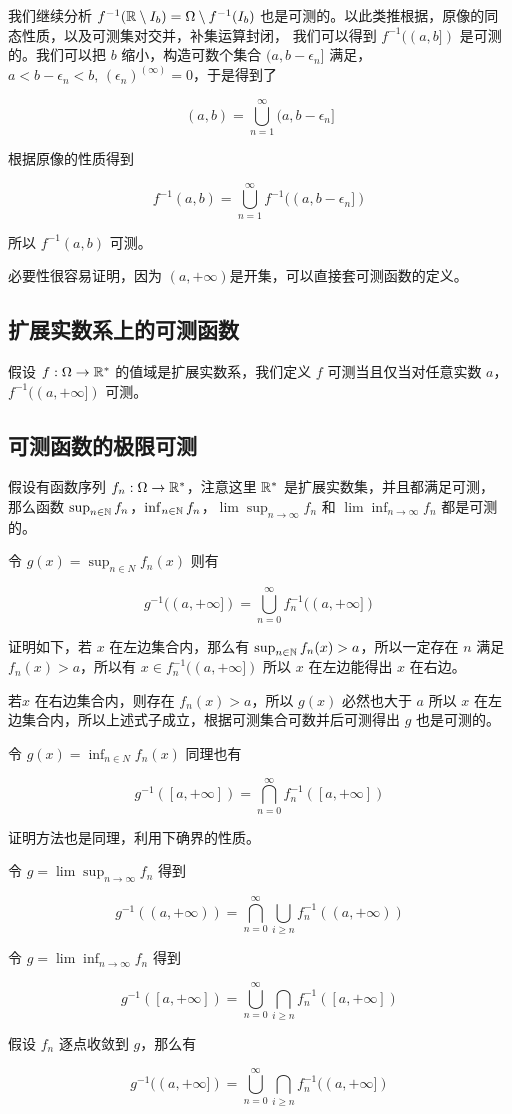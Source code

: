 我们继续分析 $f^{-1}(\mathbb{R} \setminus I_b) = \Omega \setminus f^{-1}(I_b)$ 也是可测的。以此类推根据，原像的同态性质，以及可测集对交并，补集运算封闭，
我们可以得到 $f^{-1}((a,b])$ 是可测的。我们可以把 $b$ 缩小，构造可数个集合 $(a, b - \epsilon_n]$ 满足，$a < b - \epsilon_n < b,\, (\epsilon_n)^{(\infty)} = 0$，于是得到了

\[
(a,b) = \bigcup_{n=1}^{\infty}(a, b - \epsilon_n]
\]

根据原像的性质得到

\[
f^{-1}(a,b) = \bigcup_{n=1}^{\infty} f^{-1}((a, b - \epsilon_n])
\]

所以 $f^{-1}(a,b)$ 可测。


必要性很容易证明，因为 $(a, +\infty)$是开集，可以直接套可测函数的定义。

\subsection{扩展实数系上的可测函数}

假设 $f: \Omega \to \mathbb{R}^*$ 的值域是扩展实数系，我们定义 $f$ 可测当且仅当对任意实数 $a$，$f^{-1}((a, +\infty])$ 可测。


\subsection{可测函数的极限可测}

假设有函数序列 $f_n: \Omega \to \mathbb{R}^*$，注意这里 $\mathbb{R}^*$ 是扩展实数集，并且都满足可测，
那么函数 $\sup_{n \in \mathbb{N}} f_n$，$\inf_{n \in \mathbb{N}}f_n$，$\lim \sup_{n \to \infty}f_n$ 和 
$\lim \inf_{n \to \infty}f_n$ 
都是可测的。

令 $g(x) = \sup_{n \in N}f_n(x)$ 则有

\[
g^{-1}((a, +\infty]) = \bigcup_{n = 0}^{\infty}f_n^{-1}((a, +\infty])
\]

证明如下，若 $x$ 在左边集合内，那么有 $\sup_{n \in \mathbb{N}}f_n(x) > a$，所以一定存在 $n$ 满足 $f_n(x) > a$，所以有 $x \in f_n^{-1}((a, +\infty])$
所以 $x$ 在左边能得出 $x$ 在右边。

若$x$ 在右边集合内，则存在 $f_n(x) > a$，所以 $g(x)$ 必然也大于 $a$ 所以 $x$ 在左边集合内，所以上述式子成立，根据可测集合可数并后可测得出 $g$ 也是可测的。


令 $g(x) = \inf_{n \in N}f_n(x)$ 同理也有

\[
g^{-1}([a, +\infty]) = \bigcap_{n = 0}^{\infty}f_n^{-1}([a, +\infty])
\]

证明方法也是同理，利用下确界的性质。

令 $g = \lim \sup_{n \to \infty}f_n$
得到

\[
g^{-1}((a, +\infty)) = \bigcap_{n = 0}^{\infty}\bigcup_{i \ge n}f_n^{-1}((a, +\infty))
\]


令 $g = \lim \inf_{n \to \infty}f_n$
得到

\[
g^{-1}([a, +\infty]) = \bigcup_{n = 0}^{\infty}\bigcap_{i \ge n}f_n^{-1}([a, +\infty])
\]

假设 $f_n$ 逐点收敛到 $g$，那么有

\[
g^{-1}((a, +\infty]) = \bigcup_{n = 0}^{\infty}\bigcap_{i \ge n}f_n^{-1}((a, +\infty])
\]
